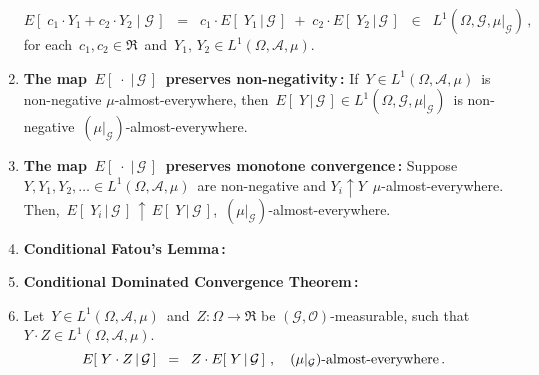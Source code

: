 \begin{theorem}
\begin{enumerate}
	\begin{equation*}
	E\!\left[\;c_{1}\cdot Y_{1} + c_{2}\cdot Y_{2}\;\vert\;\mathcal{G}\,\right]
	\;\; = \;\;
	c_{1}\cdot E\!\left[\;Y_{1}\,\vert\,\mathcal{G}\,\right]
	\; + \;
	c_{2}\cdot E\!\left[\;Y_{2}\,\vert\,\mathcal{G}\,\right]
	\;\; \in \;\; L^{1}\!\left(\Omega,\mathcal{G},\mu\vert_{\mathcal{G}}\right)
	\,,
	\end{equation*}
	for each \,$c_{1}, c_{2} \in \Re$\, and \,$Y_{1}, \, Y_{2} \in L^{1}\!\left(\Omega,\mathcal{A},\mu\right)$.
\item\label{ConditionalExpectationPreservesNonnegativity}
	\textbf{The map \,$E\!\left[\;\cdot\;\vert\,\mathcal{G}\,\right]$\, preserves non-negativity\,:}
	\vskip 0.0cm
	If \,$Y \in L^{1}\!\left(\Omega,\mathcal{A},\mu\right)$\,
	is non-negative $\mu$-almost-everywhere, then
	\,$E\!\left[\;Y\,\vert\,\mathcal{G}\,\right] \in L^{1}\!\left(\Omega,\mathcal{G},\mu\vert_{\mathcal{G}}\right)$\,
	is non-negative \,$(\mu\vert_{\mathcal{G}})$-almost-everywhere.
\item\label{ConditionalMonotoneConvergence}
	\textbf{The map \,$E\!\left[\;\cdot\;\vert\,\mathcal{G}\,\right]$\, preserves monotone convergence\,:}
	\vskip 0.0cm
	Suppose \,$Y, Y_{1}, Y_{2}, \ldots \in L^{1}(\Omega,\mathcal{A},\mu)$\,
	are non-negative and
	\;$Y_{i} \uparrow Y$\,
	$\mu$-almost-everywhere.
	\vskip 0.0cm
	Then, \,$E\!\left[\;Y_{i}\,\vert\,\mathcal{G}\,\right] \,\uparrow\, E\!\left[\;Y\,\vert\,\mathcal{G}\,\right]$,\,
	$(\mu\vert_{\mathcal{G}})$-almost-everywhere.	
\item\label{ConditionalFatouLemma}
	\textbf{Conditional Fatou's Lemma\,:}
\item\label{ConditionalDominatedConvergence}
	\textbf{Conditional Dominated Convergence Theorem\,:}
\item\label{FactorOutWhatIsKnown}
	Let \,$Y \in L^{1}(\Omega,\mathcal{A},\mu)$\, and \,$Z : \Omega \longrightarrow \Re$ be
	$(\mathcal{G},\mathcal{O})$-measurable, such that
	\,$Y \cdot Z \in L^{1}(\Omega,\mathcal{A},\mu)$.
	\begin{equation*}
	E\!\left[\;Y \cdot Z\,\vert\,\mathcal{G}\,\right]
	\;\; = \;\;
	Z \cdot E\!\left[\;Y\,\vert\,\mathcal{G}\,\right]\,,
	\quad
	\textnormal{$(\mu\vert_{\mathcal{G}})$-almost-everywhere}\,.
	\end{equation*}
\end{enumerate}
\end{theorem}

\proof

